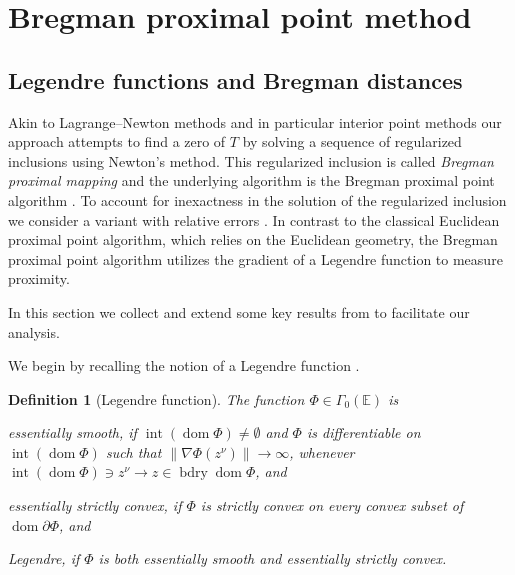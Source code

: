 \documentclass[11pt,onecolumn]{article}
\DeclareMathOperator{\dom}{dom}
\DeclareMathOperator{\intr}{int}
\DeclareMathOperator{\bdry}{bdry}
\newtheorem{definition}[definition]{Definition}
\theoremstyle{remark}
\begin{document}
\section{Bregman proximal point method} \label{sec:ppa}
\subsection{Legendre functions and Bregman distances}
Akin to Lagrange--Newton methods and in particular interior point methods our approach attempts to find a zero of $T$ by solving a sequence of regularized inclusions using Newton's method.
This regularized inclusion is called \emph{Bregman proximal mapping} and the underlying algorithm is the Bregman proximal point algorithm
\cite{Eckstein93,eckstein1998approximate,burachik1998generalized,solodov2000inexact}. To account for inexactness in the solution of the regularized inclusion we consider a variant with relative errors \cite{solodov2000inexact}.
In contrast to the classical Euclidean proximal point algorithm, which relies on the Euclidean geometry, the Bregman proximal point algorithm utilizes the gradient of a Legendre function to measure proximity.

In this section we collect and extend some key results from \cite{Roc70,bauschke1997legendre,solodov2000inexact} to facilitate our analysis.

We begin by recalling the notion of a Legendre function \cite[Section~26]{Roc70}.

\begin{definition}[Legendre function] \label{def:legendre}
The function $\Phi \in \Gamma_0(\mathbb{E})$ is
\begin{defenum}
\item \emph{essentially smooth}, if $\intr(\dom \Phi) \neq \emptyset$ and $\Phi$ is differentiable on $\intr(\dom \Phi)$ such that $\|\nabla\Phi(z^\nu)\|\to \infty$, whenever $\intr(\dom \Phi) \ni z^\nu \to z \in \bdry \dom \Phi$, and
\item \emph{essentially strictly convex}, if $\Phi$ is strictly convex on every convex subset of $\dom \partial \Phi$, and
\item \emph{Legendre}, if $\Phi$ is both essentially smooth and essentially strictly convex.
\end{defenum}
\end{definition}
\end{document}
